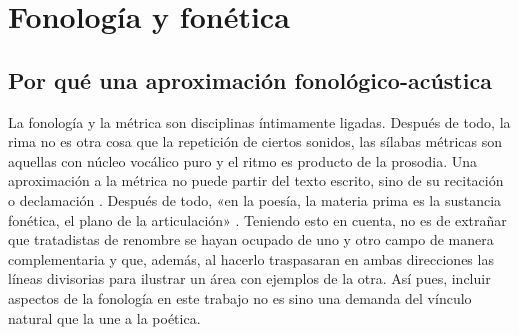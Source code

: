\chapter{Fonología y fonética}

\section{Por qué una aproximación fonológico-acústica}\setcounter{exx}{0}
La fonología y la métrica son disciplinas íntimamente ligadas. Después de todo, la rima no es otra cosa que la repetición de ciertos sonidos, las sílabas métricas son aquellas con núcleo vocálico puro y el ritmo es producto de la prosodia. Una aproximación a la métrica no puede partir del texto escrito, sino de su recitación o declamación \parencite[85]{saavedra1944}. Después de todo, «en la poesía, la materia prima es la sustancia fonética, el plano de la articulación» \parencite[96]{adanez2005}. Teniendo esto en cuenta, no es de extrañar que tratadistas de renombre se hayan ocupado de uno y otro campo de manera complementaria \parencites{quilis2019,quilis2013}{navarrotomas1991,navarrotomas2004} y que, además, al hacerlo traspasaran en ambas direcciones las líneas divisorias para ilustrar un área con ejemplos de la otra. Así pues, incluir aspectos de la fonología en este trabajo no es sino una demanda del vínculo natural que la une a la poética. 

